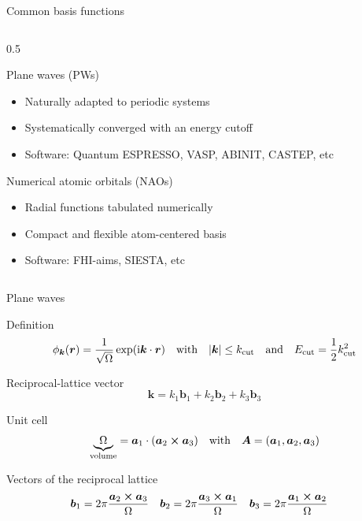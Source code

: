 \documentclass[aspectratio=169,9pt]{beamer}
\newcommand{\ba}{\boldsymbol{a}}
\newcommand{\bb}{\boldsymbol{b}}
\newcommand{\bk}{\boldsymbol{k}}
\newcommand{\br}{\boldsymbol{r}}
\newcommand{\bA}{\boldsymbol{A}}
\newcommand{\ii}{\mathrm{i}}
\begin{document}
\begin{frame}{Common basis functions}
\begin{columns}
\begin{column}{0.5\textwidth}
\begin{block}{Plane waves (PWs)}
\begin{itemize}
    				\item Naturally adapted to periodic systems
    				\item Systematically converged with an energy cutoff
    				\item Software: Quantum ESPRESSO, VASP, ABINIT, CASTEP, etc
    			\end{itemize}
			\end{block}
        	\begin{block}{Numerical atomic orbitals (NAOs)}
    			\begin{itemize}
    				\item Radial functions tabulated numerically
    				\item Compact and flexible atom-centered basis
    				\item Software: FHI-aims, SIESTA, etc
    			\end{itemize}
    		\end{block}
			\vspace{0.14\textwidth}
		\end{column}
	\end{columns}
\end{frame}

\begin{frame}{Plane waves}
	\begin{block}{Definition}
		\begin{equation*}
			\phi_{\bk}(\br) = \frac{1}{\sqrt{\Omega}}\exp(\ii \bk \cdot \br)
			\qq{with}
			\abs{\bk} \le k_\text{cut}
			\qq{and} 
			E_\text{cut} = \frac{1}{2} k_\text{cut}^2
		\end{equation*}
	\end{block}
	\begin{block}{Reciprocal-lattice vector}
		\begin{equation*}
			\bk = k_1 \bb_1 + k_2 \bb_2 + k_3 \bb_3 
		\end{equation*}
	\end{block}
	\begin{block}{Unit cell}
		\begin{equation*}
			\underbrace{\Omega}_{\text{volume}} = \ba_1 \cdot (\ba_2 \cross \ba_3)
			\qq{with}
			\bA = (\ba_1,\ba_2,\ba_3)
		\end{equation*}		
	\end{block}
	\begin{block}{Vectors of the reciprocal lattice}
		\begin{align*}
			\bb_1 & = 2\pi \frac{\ba_2 \cross \ba_3}{\Omega}
			&
			\bb_2 & = 2\pi \frac{\ba_3 \cross \ba_1}{\Omega}
			&
			\bb_3 & = 2\pi \frac{\ba_1 \cross \ba_2}{\Omega}
		\end{align*}		
	\end{block}
\end{frame}
\end{document}
